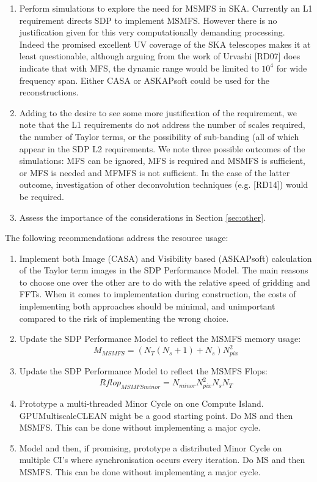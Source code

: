\documentclass[11pt,a4paper,variablewidth]{article}
\begin{document}
\begin{enumerate}
\item Perform simulations to explore the need for MSMFS in SKA. Currently an L1 requirement directs SDP to implement MSMFS. However there is no justification given for this very computationally demanding processing. Indeed the promised excellent UV coverage of the SKA telescopes makes it at least questionable, although arguing from the work of Urvashi [RD07] does indicate that with MFS, the dynamic range would be limited to $10^4$ for wide frequency span. Either CASA or ASKAPsoft could be used for the reconstructions.
\item Adding to the desire to see some more justification of the requirement, we note that the L1 requirements do not address the number of scales required, the number of Taylor terms, or the possibility of sub-banding (all of which appear in the SDP L2 requirements. We note three possible outcomes of the simulations: MFS can be ignored, MFS is required and MSMFS is sufficient, or MFS is needed and MFMFS is not sufficient. In the case of the latter outcome, investigation of other deconvolution techniques (e.g. [RD14]) would be required.
\item Assess the importance of the considerations in Section \ref{sec:other}.
\end{enumerate}

The following recommendations address the resource usage:
\begin{enumerate}[resume]
\item Implement both Image (CASA) and Visibility based (ASKAPsoft) calculation of the Taylor term images in the SDP Performance Model. The main reasons to choose one over the other are to do with the relative speed of gridding and FFTs. When it comes to implementation during construction, the costs of implementing both approaches should be minimal, and unimportant compared to the risk of implementing the wrong choice.
\item Update the SDP Performance Model to reflect the MSMFS memory usage:
\begin{equation}
M_{MSMFS} = (N_T (N_s + 1) + N_s) N_{pix}^2 
\end{equation}
\item Update the SDP Performance Model to reflect the MSMFS Flops:
\begin{equation}
Rflop_{MSMFSminor} = N_{minor} N_{pix}^2 N_s N_T	
\end{equation}
\item Prototype a multi-threaded Minor Cycle on one Compute Island. GPUMultiscaleCLEAN might be a good starting point. Do MS and then MSMFS. This can be done without implementing a major cycle.
\item Model and then, if promising, prototype a distributed Minor Cycle on multiple CI's where synchronisation occurs every iteration. Do MS and then MSMFS. This can be done without implementing a major cycle.\end{enumerate}
\end{document}
